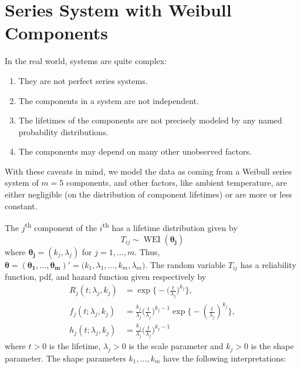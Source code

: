 \documentclass[
]{article}
\begin{document}
\hypertarget{sec:weibull}{%
\section{Series System with Weibull Components}\label{sec:weibull}}

In the real world, systems are quite complex:

\begin{enumerate}
\def\labelenumi{\arabic{enumi}.}
\item
  They are not perfect series systems.
\item
  The components in a system are not independent.
\item
  The lifetimes of the components are not precisely modeled by any named
  probability distributions.
\item
  The components may depend on many other unobserved factors.
\end{enumerate}

With these caveats in mind, we model the data as coming from a Weibull
series system of \(m = 5\) components, and other factors, like ambient
temperature, are either negligible (on the distribution of component
lifetimes) or are more or less constant.

The \(j\)\textsuperscript{th} component of the \(i\)\textsuperscript{th}
has a lifetime distribution given by \[
    T_{i j} \sim \operatorname{WEI}(\boldsymbol{\theta_j})
\] where \(\boldsymbol{\theta_j} = (k_j, \lambda_j)\) for
\(j=1,\ldots,m\). Thus,
\(\boldsymbol{\theta }= (\boldsymbol{\theta_1},\ldots,\boldsymbol{\theta_m})' = \bigl(k_1,\lambda_1,\ldots,k_m,\lambda_m\bigr)\).
The random variable \(T_{i j}\) has a reliability function, pdf, and
hazard function given respectively by \begin{align}
    R_j(t;\lambda_j,k_j)
        &= \exp\biggl\{-\biggl(\frac{t}{\lambda_j}\biggr)^{k_j}\biggr\},\\
    f_j(t;\lambda_j,k_j)
        &= \frac{k_j}{\lambda_j}\biggl(\frac{t}{\lambda_j}\biggr)^{k_j-1}
        \exp\biggl\{-\left(\frac{t}{\lambda_j}\right)^{k_j} \biggr\},\\
    h_j(t;\lambda_j,k_j) \label{eq:weibull_haz}
        &= \frac{k_j}{\lambda_j}\biggl(\frac{t}{\lambda_j}\biggr)^{k_j-1}
\end{align} where \(t > 0\) is the lifetime, \(\lambda_j > 0\) is the
scale parameter and \(k_j > 0\) is the shape parameter. The shape
parameters \(k_1, \ldots, k_m\) have the following interpretations:
\end{document}
